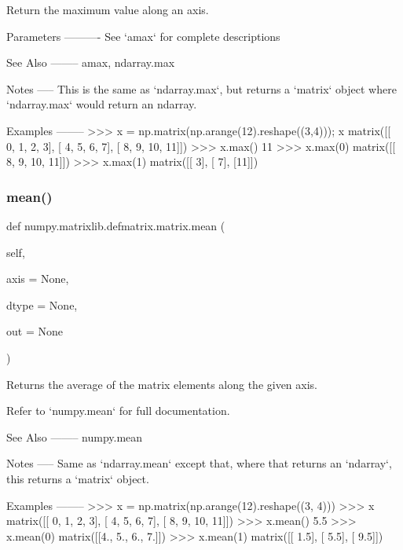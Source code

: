 \begin{DoxyVerb}Return the maximum value along an axis.

Parameters
----------
See `amax` for complete descriptions

See Also
--------
amax, ndarray.max

Notes
-----
This is the same as `ndarray.max`, but returns a `matrix` object
where `ndarray.max` would return an ndarray.

Examples
--------
>>> x = np.matrix(np.arange(12).reshape((3,4))); x
matrix([[ 0,  1,  2,  3],
[ 4,  5,  6,  7],
[ 8,  9, 10, 11]])
>>> x.max()
11
>>> x.max(0)
matrix([[ 8,  9, 10, 11]])
>>> x.max(1)
matrix([[ 3],
[ 7],
[11]])\end{DoxyVerb}
 \mbox{\label{classnumpy_1_1matrixlib_1_1defmatrix_1_1matrix_a440dd85288f80f465e1cccfb9fbb2307}} 
\subsubsection{\texorpdfstring{mean()}{mean()}}
{\footnotesize\ttfamily def numpy.\+matrixlib.\+defmatrix.\+matrix.\+mean (\begin{DoxyParamCaption}\item[{}]{self,  }\item[{}]{axis = {\ttfamily None},  }\item[{}]{dtype = {\ttfamily None},  }\item[{}]{out = {\ttfamily None} }\end{DoxyParamCaption})}

\begin{DoxyVerb}Returns the average of the matrix elements along the given axis.

Refer to `numpy.mean` for full documentation.

See Also
--------
numpy.mean

Notes
-----
Same as `ndarray.mean` except that, where that returns an `ndarray`,
this returns a `matrix` object.

Examples
--------
>>> x = np.matrix(np.arange(12).reshape((3, 4)))
>>> x
matrix([[ 0,  1,  2,  3],
[ 4,  5,  6,  7],
[ 8,  9, 10, 11]])
>>> x.mean()
5.5
>>> x.mean(0)
matrix([[4., 5., 6., 7.]])
>>> x.mean(1)
matrix([[ 1.5],
[ 5.5],
[ 9.5]])\end{DoxyVerb}
 \mbox{\label{classnumpy_1_1matrixlib_1_1defmatrix_1_1matrix_a9e710255644a156e0601245c609a2d53}} 
